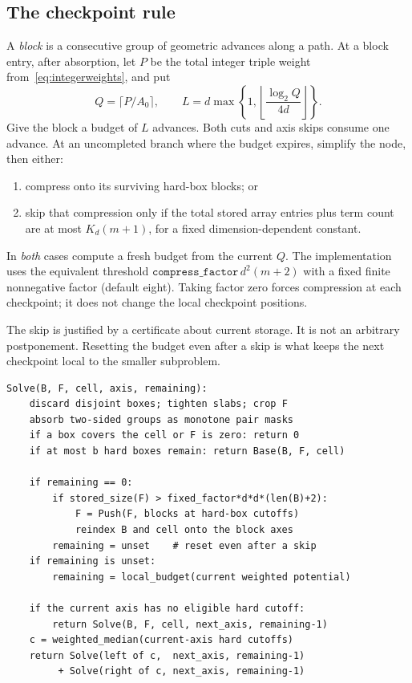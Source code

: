 \documentclass[12pt,a4paper]{article}
\theoremstyle{definition}
\begin{document}
\subsection{The checkpoint rule}
A \emph{block} is a consecutive group of geometric advances along a
path. At a block entry, after absorption, let $P$ be the total integer
triple weight from~\eqref{eq:integerweights}, and put
\begin{equation}
 Q=\lceil P/A_0\rceil,\qquad
 L=d\max\left\{1,\left\lfloor\frac{\log_2 Q}{4d}\right\rfloor\right\}.
 \label{eq:localbudget}
\end{equation}
Give the block a budget of $L$ advances. Both cuts and axis skips consume
one advance. At an uncompleted branch where the budget expires, simplify
the node, then either:
\begin{enumerate}
\item compress onto its surviving hard-box blocks; or
\item skip that compression only if the total stored array entries plus
term count are at most $K_d(m+1)$, for a fixed dimension-dependent constant.
\end{enumerate}
In \emph{both} cases compute a fresh budget from the current $Q$.
The implementation uses the equivalent threshold
$\texttt{compress\_factor}\,d^2(m+2)$ with a fixed finite nonnegative
factor (default eight). Taking factor zero forces compression at each
checkpoint; it does not change the local checkpoint positions.

The skip is justified by a certificate about current storage. It is not
an arbitrary postponement. Resetting the budget even after a skip is
what keeps the next checkpoint local to the smaller subproblem.

\begin{center}
\begin{minipage}{.97\linewidth}
\begin{lstlisting}[caption={Local-checkpoint recursion; all cell bounds are inclusive.},label={alg:local}]
Solve(B, F, cell, axis, remaining):
    discard disjoint boxes; tighten slabs; crop F
    absorb two-sided groups as monotone pair masks
    if a box covers the cell or F is zero: return 0
    if at most b hard boxes remain: return Base(B, F, cell)

    if remaining == 0:
        if stored_size(F) > fixed_factor*d*d*(len(B)+2):
            F = Push(F, blocks at hard-box cutoffs)
            reindex B and cell onto the block axes
        remaining = unset    # reset even after a skip
    if remaining is unset:
        remaining = local_budget(current weighted potential)

    if the current axis has no eligible hard cutoff:
        return Solve(B, F, cell, next_axis, remaining-1)
    c = weighted_median(current-axis hard cutoffs)
    return Solve(left of c,  next_axis, remaining-1)
         + Solve(right of c, next_axis, remaining-1)
\end{lstlisting}
\end{minipage}
\end{center}
\end{document}
